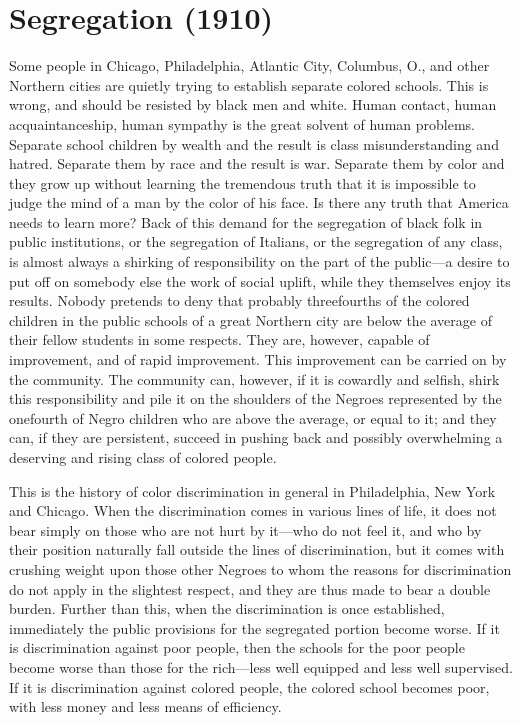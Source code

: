 \documentclass[letterpaper,10pt,english]{jupyterBook}
\begin{document}
\section{Segregation (1910)}
\label{\detokenize{Volumes/01/01/Segregation:segregation-1910}}\label{\detokenize{Volumes/01/01/Segregation::doc}}
\sphinxAtStartPar
Some people in Chicago, Philadelphia, Atlantic City, Columbus, O., and other Northern cities are quietly trying to establish separate colored schools. This is wrong, and should be resisted by black men and white. Human contact, human acquaintanceship, human sympathy is the great solvent of human problems. Separate school children by wealth and the result is class misunderstanding and hatred. Separate them by race and the result is war. Separate them by color and they grow up without learning the tremendous truth that it is impossible to judge the mind of a man by the color of his face. Is there any truth that America needs to learn more? Back of this demand for the segregation of black folk in public institutions, or the segregation of Italians, or the segregation of any class, is almost always a shirking of responsibility on the part of the public—a desire to put off on somebody else the work of social uplift, while they themselves enjoy its results. Nobody pretends to deny that probably three\sphinxhyphen{}fourths of the colored children in the public schools of a great Northern city are below the average of their fellow students in some respects. They are, however, capable of improvement, and of rapid improvement. This improvement can be carried on by the community. The community can, however, if it is cowardly and selfish, shirk this responsibility and pile it on the shoulders of the Negroes represented by the one\sphinxhyphen{}fourth of Negro children who are above the average, or equal to it; and they can, if they are persistent, succeed in pushing back and possibly overwhelming a deserving and rising class of colored people.

\sphinxAtStartPar
This is the history of color discrimination in general in Philadelphia, New York and Chicago. When the discrimination comes in various lines of life, it does not bear simply on those who are not hurt by it—who do not feel it, and who by their position naturally fall outside the lines of discrimination, but it comes with crushing weight upon those other Negroes to whom the reasons for discrimination do not apply in the slightest respect, and they are thus made to bear a double burden. Further than this, when the discrimination is once established, immediately the public provisions for the segregated portion become worse. If it is discrimination against poor people, then the schools for the poor people become worse than those for the rich—less well equipped and less well supervised. If it is discrimination against colored people, the colored school becomes poor, with less money and less means of efficiency.
\end{document}
